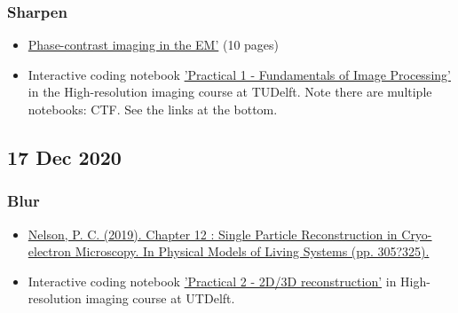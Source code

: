 \documentclass[11pt, oneside]{article}   	%
\begin{document}
\subsubsection{Sharpen}
\begin{itemize}
	\item  \href{https://cryoemprinciples.yale.edu/sites/default/files/files/2%20Phase%20contrast.pdf}{Phase-contrast imaging in the EM'} (10 pages)
	\item Interactive coding notebook \href{https://gitlab.tudelft.nl/aj-lab/teaching/-/wikis/NB4020}{'Practical 1 - Fundamentals of Image Processing'} in the High-resolution imaging course at TUDelft. Note there are multiple notebooks: CTF. See the links at the bottom.
\end{itemize}

\pagebreak
\subsection{17 Dec 2020}
\subsubsection{Blur}
\begin{itemize}
	\item \href{https://repository.upenn.edu/cgi/viewcontent.cgi?article=1665&context=physics_papers}{Nelson, P. C. (2019). Chapter 12 : Single Particle Reconstruction in Cryo-electron Microscopy. In Physical Models of Living Systems (pp. 305?325).}
	\item Interactive coding notebook \href{https://gitlab.tudelft.nl/aj-lab/teaching/-/wikis/NB4020}{'Practical 2 - 2D/3D reconstruction'} in High-resolution imaging course at UTDelft.
\end{itemize}
\end{document}
